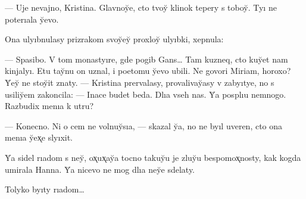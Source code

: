 \documentclass[10pt]{book}
\begin{document}
— Uje nevajno, Kristina. Glavnoy̆e, cto tvoy̆ klinok tepery s toboy̆. Tyı ne poterıala y̆evo.

Ona ulyıbnulasy prizrakom svoy̆ey̆ proxloy̆ ulyıbki, xepnula:

— Spasibo. V tom monastyıre, gde pogib Gans… Tam kuzneq, cto kuy̆et nam kinjalyı. Etu tay̆nu on uznal, i poetomu y̆evo ubili. Ne govori Miriam, horoxo? Y̆ey̆ ne stoy̆it znaty. — Kristina prervalasy, provalivay̆asy v zabyıtye, no s usiliy̆em zakoncila: — Inace budet beda. Dlıa vseh nas. Y̆a posplıu nemnogo. Razbudix menıa k utru?

— Konecno. Ni o cem ne volnuy̆sıa, — skazal y̆a, no ne byıl uveren, cto ona menıa y̆ex̨e slyıxit.

Y̆a sidel rıadom s ney̆, ox̨ux̨ay̆a tocno takuy̆u je zluy̆u bespomox̨nosty, kak kogda umirala Hanna. Y̆a nicevo ne mog dlıa ney̆e sdelaty.

Tolyko byıty rıadom…
\end{document}
